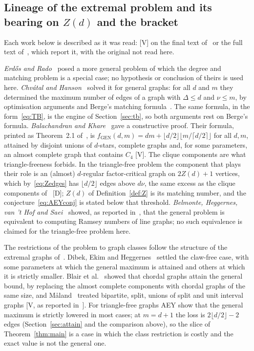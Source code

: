 \documentclass[11pt]{article}
\theoremstyle{remark}
\begin{document}
\subsection{Lineage of the extremal problem and its bearing on \texorpdfstring{$Z(d)$}{Z(d)} and the bracket}\label{sec:lineage}

Each work below is described as it was read: [V] on the final text of~\cite{AEY} or the full text of~\cite{BET}, which report it, with the original not read here.

\emph{Erd\H{o}s and Rado~\cite{ER}} posed a more general problem of which the degree and matching problem is a special case; no hypothesis or conclusion of theirs is used here. \emph{Chv\'atal and Hanson~\cite{CH}} solved it for general graphs: for all $d$ and $m$ they determined the maximum number of edges of a graph with $\Delta\le d$ and $\nu\le m$, by optimisation arguments and Berge's matching formula~\cite{BET,AEY}. The same formula, in the form~\eqref{eq:TB}, is the engine of Section~\ref{sec:tb}, so both arguments rest on Berge's formula. \emph{Balachandran and Khare~\cite{BK}} gave a constructive proof. Their formula, printed as Theorem~2.1 of~\cite{AEY}, is $f_{\mathrm{GEN}}(d,m)=dm+\lfloor d/2\rfloor\lfloor m/\lceil d/2\rceil\rfloor$ for all $d,m$, attained by disjoint unions of $d$-stars, complete graphs and, for some parameters, an almost complete graph that contains $C_4$ [V]. The clique components are what triangle-freeness forbids. In the triangle-free problem the component that plays their role is an (almost) $d$-regular factor-critical graph on $2Z(d)+1$ vertices, which by~\eqref{eq:Zedges} has $\lfloor d/2\rfloor$ edges above $d\nu$, the same excess as the clique components of~\cite{BK} [D]; $Z(d)$ of Definition~\ref{def:Z} is its matching number, and the conjecture~\eqref{eq:AEYconj} is stated below that threshold. \emph{Belmonte, Heggernes, van 't Hof and Saei~\cite{Belmonte}} showed, as reported in~\cite{AEY}, that the general problem is equivalent to computing Ramsey numbers of line graphs; no such equivalence is claimed for the triangle-free problem here.

The restrictions of the problem to graph classes follow the structure of the extremal graphs of~\cite{BK}. Dibek, Ekim and Heggernes~\cite{Dibek} settled the claw-free case, with some parameters at which the general maximum is attained and others at which it is strictly smaller. Blair et al.~\cite{Blair} showed that chordal graphs attain the general bound, by replacing the almost complete components with chordal graphs of the same size, and M\aa land~\cite{Maland} treated bipartite, split, unions of split and unit interval graphs [V, as reported in~\cite{AEY}]. For triangle-free graphs AEY show that the general maximum is strictly lowered in most cases; at $m=d+1$ the loss is $2\lfloor d/2\rfloor-2$ edges (Section~\ref{sec:attain} and the comparison above), so the slice of Theorem~\ref{thm:main} is a case in which the class restriction is costly and the exact value is not the general one.
\end{document}
